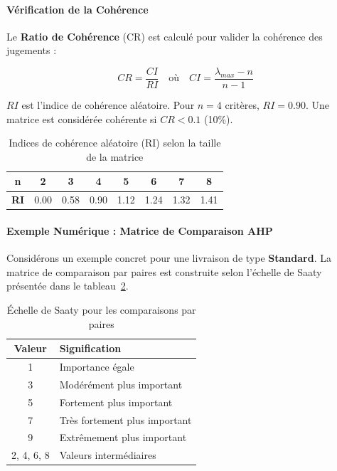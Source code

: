 \documentclass[11pt,a4paper]{report}
\begin{document}
\paragraph{Vérification de la Cohérence}
Le \textbf{Ratio de Cohérence} (CR) est calculé pour valider la cohérence des jugements :

\begin{equation}
    CR = \frac{CI}{RI} \quad \text{où} \quad CI = \frac{\lambda_{max} - n}{n - 1}
    \label{eq:consistency_ratio}
\end{equation}

$RI$ est l'indice de cohérence aléatoire. Pour $n=4$ critères, $RI = 0.90$. Une matrice est considérée cohérente si $CR < 0.1$ (10\%).

\begin{table}[H]
    \centering
    \caption{Indices de cohérence aléatoire (RI) selon la taille de la matrice}
    \label{tab:random_index}
    \begin{tabular}{|c|c|c|c|c|c|c|c|}
        \hline
        \textbf{n} & 2 & 3 & 4 & 5 & 6 & 7 & 8 \\
        \hline
        \textbf{RI} & 0.00 & 0.58 & 0.90 & 1.12 & 1.24 & 1.32 & 1.41 \\
        \hline
    \end{tabular}
\end{table}

\paragraph{Exemple Numérique : Matrice de Comparaison AHP}

Considérons un exemple concret pour une livraison de type \textbf{Standard}. La matrice de comparaison par paires est construite selon l'échelle de Saaty présentée dans le tableau~\ref{tab:saaty_scale}.

\begin{table}[H]
    \centering
    \caption{Échelle de Saaty pour les comparaisons par paires}
    \label{tab:saaty_scale}
    \begin{tabular}{|c|l|}
        \hline
        \textbf{Valeur} & \textbf{Signification} \\
        \hline
        1 & Importance égale \\
        3 & Modérément plus important \\
        5 & Fortement plus important \\
        7 & Très fortement plus important \\
        9 & Extrêmement plus important \\
        2, 4, 6, 8 & Valeurs intermédiaires \\
        \hline
    \end{tabular}
\end{table}
\end{document}
